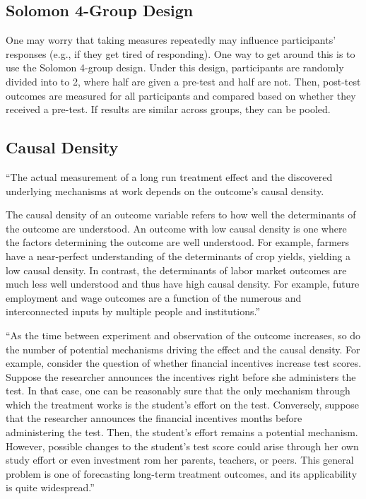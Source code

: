 \documentclass[10pt]{article}
\begin{document}
\subsection{Solomon 4-Group Design}

One may worry that taking measures repeatedly 
may influence participants' responses (e.g., if they 
get tired of responding). One way to get around this 
is to use the Solomon 4-group design. Under this design,
participants are randomly divided into to 2, where 
half are given a pre-test and half are not. Then,
post-test outcomes are measured for all participants
and compared based on whether they received a pre-test. 
If results are similar across groups, they can be pooled.


\subsection{Causal Density}


``The actual measurement of a long run treatment effect and the discovered underlying 
mechanisms at work depends on the outcome's causal density.

The causal density of an outcome variable refers to how well the 
determinants of the outcome are understood. An outcome with low 
causal density is one where the factors determining the outcome 
are well understood. For example, farmers have a near-perfect 
understanding of the determinants of crop yields, yielding a low 
causal density. In contrast, the determinants of labor market 
outcomes are much less well understood and thus have high causal density. 
For example, future employment and wage outcomes are a function 
of the numerous and interconnected inputs by multiple people 
and institutions.''

``As the time between experiment and observation of the outcome increases, 
so do the number of potential mechanisms driving the effect and
the causal density. For example, consider the question of 
whether financial incentives increase test scores. Suppose 
the researcher announces the incentives right before 
she administers the test. In that case, one can be 
reasonably sure that the only mechanism through which the
treatment works is the student's effort on the test. 
Conversely, suppose that the researcher announces the 
financial incentives months before administering the test.
Then, the student's effort remains a potential mechanism.
However, possible changes to the student's test score
could arise through her own study effort or even investment
rom her parents, teachers, or peers. This general
problem is one of forecasting long-term treatment outcomes, 
and its applicability is quite widespread.''
\end{document}
